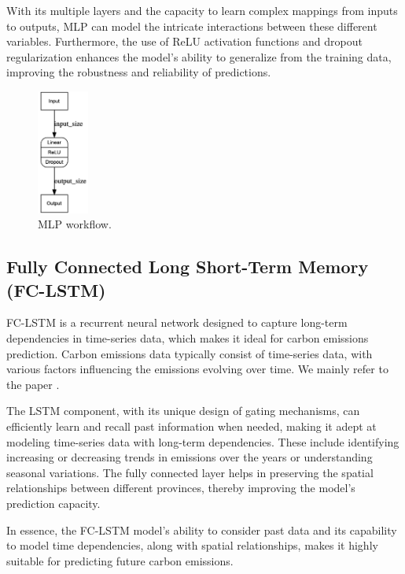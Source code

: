 \documentclass[sigconf, authordraft]{acmart}
\begin{document}
	With its multiple layers and the capacity to learn complex mappings from inputs
	to outputs, MLP can model the intricate interactions between these different
	variables. Furthermore, the use of ReLU activation functions and dropout
	regularization enhances the model's ability to generalize from the training
	data, improving the robustness and reliability of predictions.

	\begin{figure}[ht]
		\centering
		\includegraphics[width=0.15\textwidth]{figures/MLP_flow.png}
		\caption{MLP workflow.}
		\label{fig:MLP_flow}
	\end{figure}

	\subsection{Fully Connected Long Short-Term Memory (FC-LSTM)}


	FC-LSTM is a recurrent neural network designed to capture long-term
	dependencies in time-series data, which makes it ideal for carbon emissions prediction.
	Carbon emissions data typically consist of time-series data, with various factors
	influencing the emissions evolving over time. We mainly refer to the paper
	\cite{tao2023-multiplea}.

	The LSTM component, with its unique design of gating mechanisms, can
	efficiently learn and recall past information when needed, making it adept at modeling
	time-series data with long-term dependencies. These include identifying
	increasing or decreasing trends in emissions over the years or understanding
	seasonal variations. The fully connected layer helps in preserving the spatial
	relationships between different provinces, thereby improving the model's
	prediction capacity.

	In essence, the FC-LSTM model's ability to consider past data and its capability
	to model time dependencies, along with spatial relationships, makes it highly suitable
	for predicting future carbon emissions.
\end{document}
